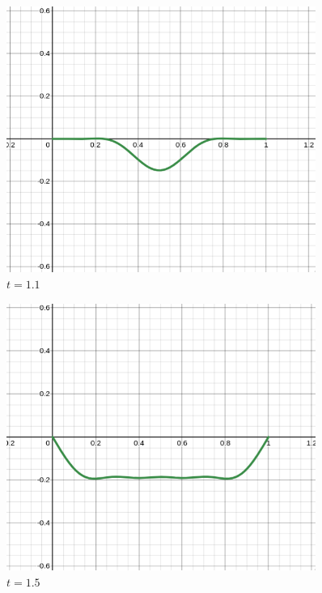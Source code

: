 \documentclass[letter]{article}
\begin{document}
\begin{minipage}{0.5\textwidth}
\begin{figure}[H]
	\centering
	\includegraphics[width=0.9\textwidth]{ss/dx1.png}
	\caption{$t = 1.1$}
	\label{fig:ss-c_n_001-png}
\end{figure}
\begin{figure}[H]
	\centering
	\includegraphics[width=0.9\textwidth]{ss/dx2.png}
	\caption{$t =  1.5 $}
	\label{fig:ss-c_n_01-png}
\end{figure}
\end{minipage}
\hfill %
\end{document}

